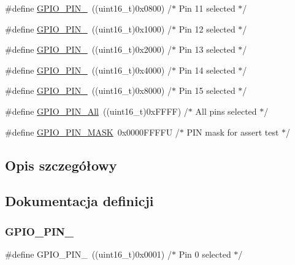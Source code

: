 \begin{DoxyCompactItemize}
\item 
\#define \hyperlink{group___g_p_i_o__pins__define_ga79f6797ea82c1fb25cd6c0e14e44d312}{G\+P\+I\+O\+\_\+\+P\+I\+N\+\_}~((uint16\+\_\+t)0x0800)  /$\ast$ Pin 11 selected   $\ast$/
\item 
\#define \hyperlink{group___g_p_i_o__pins__define_ga95f9ce5911fa8b209defb969db93ced3}{G\+P\+I\+O\+\_\+\+P\+I\+N\+\_}~((uint16\+\_\+t)0x1000)  /$\ast$ Pin 12 selected   $\ast$/
\item 
\#define \hyperlink{group___g_p_i_o__pins__define_ga173023dced8f9692ade0f1176558ef70}{G\+P\+I\+O\+\_\+\+P\+I\+N\+\_}~((uint16\+\_\+t)0x2000)  /$\ast$ Pin 13 selected   $\ast$/
\item 
\#define \hyperlink{group___g_p_i_o__pins__define_ga315b4dc1a0c1f9021b3d3a8fe9ccc0c3}{G\+P\+I\+O\+\_\+\+P\+I\+N\+\_}~((uint16\+\_\+t)0x4000)  /$\ast$ Pin 14 selected   $\ast$/
\item 
\#define \hyperlink{group___g_p_i_o__pins__define_ga77be5756e80bcdf18e1aa39b35d1d640}{G\+P\+I\+O\+\_\+\+P\+I\+N\+\_}~((uint16\+\_\+t)0x8000)  /$\ast$ Pin 15 selected   $\ast$/
\item 
\#define \hyperlink{group___g_p_i_o__pins__define_gac04170878de13aa9785f6bd666c9faa5}{G\+P\+I\+O\+\_\+\+P\+I\+N\+\_\+\+All}~((uint16\+\_\+t)0x\+F\+F\+F\+F)  /$\ast$ All pins selected $\ast$/
\item 
\#define \hyperlink{group___g_p_i_o__pins__define_gab135afee57cdef0f647ab153f88b6d2f}{G\+P\+I\+O\+\_\+\+P\+I\+N\+\_\+\+M\+A\+SK}~0x0000\+F\+F\+F\+F\+U /$\ast$ P\+I\+N mask for assert test $\ast$/
\end{DoxyCompactItemize}


\subsection{Opis szczegółowy}


\subsection{Dokumentacja definicji}
\mbox{\label{group___g_p_i_o__pins__define_ga176efbf43a259b7bb0a85a47401505be}} 
\subsubsection{\texorpdfstring{G\+P\+I\+O\+\_\+\+P\+I\+N\+\_}{GPIO\_PIN\_0}}
{\footnotesize\ttfamily \#define G\+P\+I\+O\+\_\+\+P\+I\+N\+\_~((uint16\+\_\+t)0x0001)  /$\ast$ Pin 0 selected    $\ast$/}




